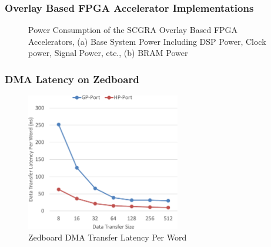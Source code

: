 \documentclass[accentcolor=tud1a,colorbacktitle,inverttitle,landscape,german,presentation,t]{tudbeamer}
\begin{document}
  \begin{frame}
  \frametitle{Overlay Based FPGA Accelerator Implementations}
  \begin{figure}[htb]
  \centering
    \caption{Power Consumption of the SCGRA Overlay Based FPGA Accelerators, (a) Base System Power Including DSP Power, Clock power, Signal Power, etc., (b) BRAM Power}
    \label{fig:SCGRA-Power}
  \end{figure}

  \end{frame}

  \begin{frame}
  \frametitle{DMA Latency on Zedboard}
  \begin{figure}[htb]
    \centering
    \includegraphics[width=0.6\textwidth]{dma-latency}
    \caption{Zedboard DMA Transfer Latency Per Word}
    \label{fig:dma-latency}
  \end{figure}

  \end{frame}
\end{document}
